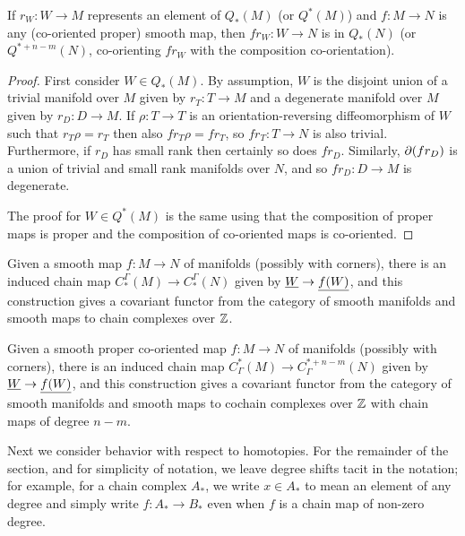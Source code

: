 \begin{lemma}\label{L: Q preservation}
	If $r_W \colon W \to M$ represents an element of $Q_*(M)$ (or $Q^*(M)$) and $f \colon M \to N$ is any (co-oriented proper) smooth map, then $fr_W \colon W \to N$ is in $Q_*(N)$ (or $Q^{*+n-m}(N)$, co-orienting $fr_W$ with the composition co-orientation).
\end{lemma}

\begin{proof}
	First consider $W \in Q_*(M)$.
	By assumption, $W$ is the disjoint union of a trivial manifold over $M$ given by $r_T \colon T \to M$ and a degenerate manifold over $M$ given by $r_D:D \to M$.
	If $\rho \colon T \to T$ is an orientation-reversing diffeomorphism of $W$ such that $r_T\rho = r_T$ then also $fr_T\rho = fr_T$, so $fr_T \colon T \to N$ is also trivial.
	Furthermore, if $r_D$ has small rank then certainly so does $fr_D$.
	Similarly, $\partial(fr_D)$ is a union of trivial and small rank manifolds over $N$, and so $fr_D:D \to M$ is degenerate.

	The proof for $W \in Q^*(M)$ is the same using that the composition of proper maps is proper and the composition of co-oriented maps is co-oriented.
\end{proof}

\begin{corollary}\label{C: homology chain map}
	Given a smooth map $f \colon M \to N$ of manifolds (possibly with corners), there is an induced chain map $C_*^\Gamma(M) \to C_*^\Gamma(N)$ given by $\underline{W} \to \underline{f(W)}$, and this construction gives a covariant functor from the category of smooth manifolds and smooth maps to chain complexes over $\mathbb{Z}$.
\end{corollary}

\begin{corollary}\label{C: proper cofunctoriality}
	Given a smooth proper co-oriented map $f \colon M \to N$ of manifolds (possibly with corners), there is an induced chain map $C^*_\Gamma(M) \to C^{*+n-m}_\Gamma(N)$ given by $\underline{W} \to \underline{f(W)}$, and this construction gives a covariant functor from the category of smooth manifolds and smooth maps to cochain complexes over $\mathbb{Z}$ with chain maps of degree $n-m$.
\end{corollary}

Next we consider behavior with respect to homotopies.
For the remainder of the section, and for simplicity of notation, we leave degree shifts tacit in the notation; for example, for a chain complex $A_*$, we write $x \in A_*$ to mean an element of any degree and simply write $f \colon A_* \to B_*$ even when $f$ is a chain map of non-zero degree.

